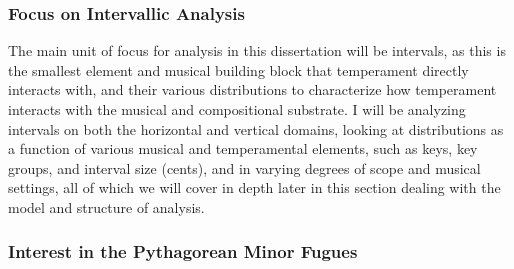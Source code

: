 \subsubsection{Focus on Intervallic
Analysis}\label{focus-on-intervallic-analysis}

The main unit of focus for analysis in this dissertation will be
intervals, as this is the smallest element and musical building block
that temperament directly interacts with, and their various
distributions to characterize how temperament interacts with the musical
and compositional substrate. I will be analyzing intervals on both the
horizontal and vertical domains, looking at distributions as a function
of various musical and temperamental elements, such as keys, key groups,
and interval size (cents), and in varying degrees of scope and musical
settings, all of which we will cover in depth later in this section
dealing with the model and structure of analysis.

\subsubsection{Interest in the Pythagorean Minor
Fugues}\label{interest-in-the-pythagorean-minor-fugues}


